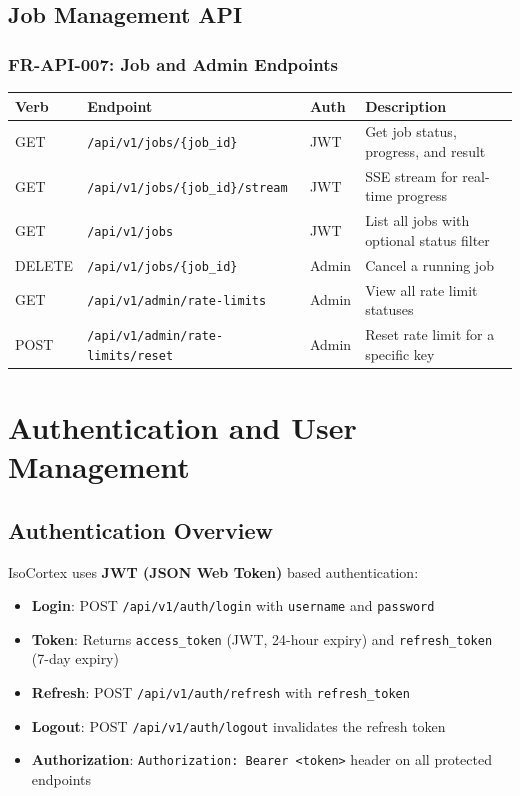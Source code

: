 \documentclass[11pt,a4paper]{article}
\newcommand{\inlinecode}[1]{\texttt{\small\colorbox{ctCodeBg}{#1}}}
\newcommand{\apipath}[1]{\texttt{\small\textcolor{ctAccentBlue}{#1}}}
\begin{document}
\subsection{Job Management API}

\subsubsection{FR-API-007: Job and Admin Endpoints}

\begin{longtable}{@{}p{1.5cm}p{4.5cm}p{3cm}p{5cm}@{}}
\toprule
\textbf{Verb} & \textbf{Endpoint} & \textbf{Auth} & \textbf{Description} \\
\midrule
\endhead
GET & \apipath{/api/v1/jobs/\{job\_id\}} & JWT & Get job status, progress, and result \\
GET & \apipath{/api/v1/jobs/\{job\_id\}/stream} & JWT & SSE stream for real-time progress \\
GET & \apipath{/api/v1/jobs} & JWT & List all jobs with optional status filter \\
DELETE & \apipath{/api/v1/jobs/\{job\_id\}} & Admin & Cancel a running job \\
GET & \apipath{/api/v1/admin/rate-limits} & Admin & View all rate limit statuses \\
POST & \apipath{/api/v1/admin/rate-limits/reset} & Admin & Reset rate limit for a specific key \\
\bottomrule
\end{longtable}

\section{Authentication and User Management}

\subsection{Authentication Overview}

IsoCortex uses \textbf{JWT (JSON Web Token)} based authentication:

\begin{itemize}
    \item \textbf{Login}: POST \apipath{/api/v1/auth/login} with \inlinecode{username} and \inlinecode{password}
    \item \textbf{Token}: Returns \inlinecode{access\_token} (JWT, 24-hour expiry) and \inlinecode{refresh\_token} (7-day expiry)
    \item \textbf{Refresh}: POST \apipath{/api/v1/auth/refresh} with \inlinecode{refresh\_token}
    \item \textbf{Logout}: POST \apipath{/api/v1/auth/logout} invalidates the refresh token
    \item \textbf{Authorization}: \inlinecode{Authorization: Bearer <token>} header on all protected endpoints
\end{itemize}
\end{document}
